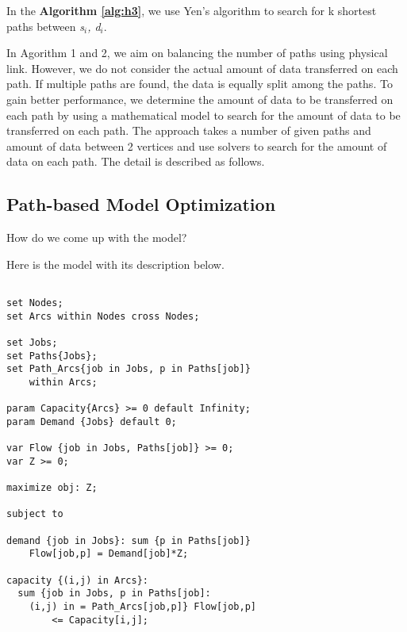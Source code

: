 In the \textbf{Algorithm \ref{alg:h3}}, we use Yen's algorithm to search for k shortest paths between \textit{s$_i$, d$_i$}.

In Agorithm 1 and 2, we aim on balancing the number of paths using physical link. However, we do not consider the actual amount of data transferred on each path. If multiple paths are found, the data is equally split among the paths. To gain better performance, we determine the amount of data to be transferred on each path by using a mathematical model to search for the amount of data to be transferred on each path. The approach takes a number of given paths and amount of data between 2 vertices and use solvers to search for the amount of data on each path. The detail is described as follows.

\subsection{Path-based Model Optimization}

How do we come up with the model?

Here is the model with its description below.

\begingroup
\fontsize{9pt}{9pt}\selectfont

\begin{verbatim}

set Nodes;
set Arcs within Nodes cross Nodes;

set Jobs;
set Paths{Jobs};
set Path_Arcs{job in Jobs, p in Paths[job]} 
    within Arcs;

param Capacity{Arcs} >= 0 default Infinity;
param Demand {Jobs} default 0;

var Flow {job in Jobs, Paths[job]} >= 0;
var Z >= 0;

maximize obj: Z;

subject to

demand {job in Jobs}: sum {p in Paths[job]} 
	Flow[job,p] = Demand[job]*Z;

capacity {(i,j) in Arcs}:
  sum {job in Jobs, p in Paths[job]: 
    (i,j) in = Path_Arcs[job,p]} Flow[job,p] 
		<= Capacity[i,j];

\end{verbatim}

\endgroup

